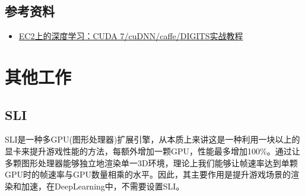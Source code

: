 \subsection{参考资料}
\begin{itemize}
\item \href{http://www.csdn.net/article/2015-05-07/2824637}{EC2上的深度学习：CUDA 7/cuDNN/caffe/DIGITS实战教程}
\end{itemize}


\section{其他工作}
\subsection{SLI}
SLI是一种多GPU(图形处理器)扩展引擎，从本质上来讲这是一种利用一块以上的显卡来提升游戏性能的方法，每额外增加一颗GPU，性能最多增加100\%。通过让多颗图形处理器能够独立地渲染单一3D环境，理论上我们能够让帧速率达到单颗GPU时的帧速率与GPU数量相乘的水平。因此，其主要作用是提升游戏场景的渲染和加速，在DeepLearning中，不需要设置SLI。



